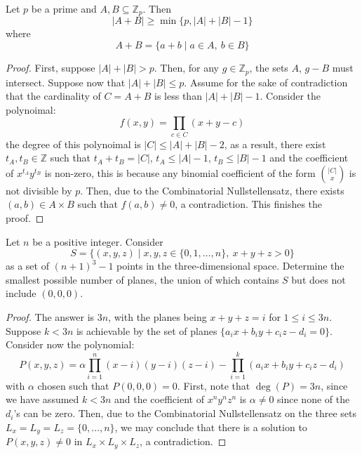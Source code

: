 \begin{theorem}
    Let $p$ be a prime and $A,B\subseteq\mathbb{Z}_p$. Then 
    \begin{equation*}
        |A + B|\ge\min\{p, |A| + |B| - 1\}
    \end{equation*}
    where 
    \begin{equation*}
        A + B = \{a + b\mid a\in A,~b\in B\}
    \end{equation*}
\end{theorem}
\begin{proof}
    First, suppose $|A| + |B| > p$. Then, for any $g\in\mathbb{Z}_p$, the sets $A$, $g - B$ must intersect. Suppose now that $|A| + |B|\le p$. Assume for the sake of contradiction that the cardinality of $C = A + B$ is less than $|A| + |B| - 1$. Consider the polynoimal:
    \begin{equation*}
        f(x, y) = \prod_{c\in C}(x + y - c)
    \end{equation*}
    the degree of this polynoimal is $|C|\le |A| + |B| - 2$, as a result, there exist $t_A, t_B\in\mathbb{Z}$ such that $t_A + t_B = |C|$, $t_A\le|A| - 1$, $t_B\le|B| - 1$ and the coefficient of $x^{t_A}y^{t_B}$ is non-zero, this is because any binomial coefficient of the form $\binom{|C|}{x}$ is not divisible by $p$. Then, due to the Combinatorial Nullstellensatz, there exists $(a,b)\in A\times B$ such that $f(a,b)\ne0$, a contradiction. This finishes the proof.
\end{proof}

\begin{example}[IMO 2007/6]
    Let $n$ be a positive integer. Consider 
    \begin{equation*}
        S = \{(x, y, z)\mid x,y,z\in\{0,1,\ldots,n\},~x + y + z > 0\}
    \end{equation*}
    as a set of $(n + 1)^3 - 1$ points in the three-dimensional space. Determine the smallest possible number of planes, the union of which contains $S$ but does not include $(0,0,0)$.
\end{example}
\begin{proof}
    The answer is $3n$, with the planes being $x + y + z = i$ for $1\le i\le 3n$. Suppose $k < 3n$ is achievable by the set of planes $\{a_ix + b_iy + c_iz - d_i = 0\}$. Consider now the polynomial:
    \begin{equation*}
        P(x, y, z) = \alpha\prod_{i=1}^n(x - i)(y - i)(z - i) - \prod_{i=1}^k(a_ix + b_iy + c_iz - d_i)
    \end{equation*}
    with $\alpha$ chosen such that $P(0, 0, 0) = 0$. First, note that $\deg(P) = 3n$, since we have assumed $k < 3n$ and the coefficient of $x^ny^nz^n$ is $\alpha\ne 0$ since none of the $d_i$'s can be zero. Then, due to the Combinatorial Nullstellensatz on the three sets $L_x = L_y = L_z = \{0,\ldots,n\}$, we may conclude that there is a solution to $P(x, y, z)\ne 0$ in $L_x\times L_y\times L_z$, a contradiction.
\end{proof}

